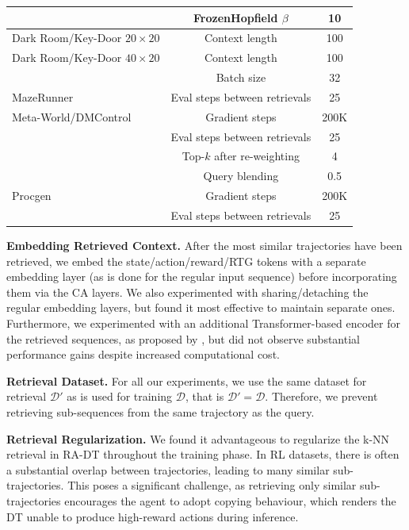 \begin{table}[]
\begin{tabular}{l | c c}
      &      FrozenHopfield $\beta$ & 10 \\
    \midrule
     Dark Room/Key-Door $20\times20$ &      Context length & 100 \\
    \midrule
     Dark Room/Key-Door $40\times20$ &      Context length & 100 \\
      &      Batch size & 32 \\
     \midrule
     MazeRunner &      Eval steps between retrievals & 25 \\
    \midrule
     Meta-World/DMControl &  Gradient steps & 200K \\
      &                      Eval steps between retrievals & 25 \\
      &      Top-$k$ after re-weighting & 4 \\
      &  Query blending                 & 0.5 \\  
    \midrule
     Procgen &      Gradient steps & 200K \\     
             &      Eval steps between retrievals & 25 \\
    \bottomrule
    \end{tabular}
    \label{tab:radt-hparams}
\end{table}

\textbf{Embedding Retrieved Context.}
After the most similar trajectories have been retrieved, we embed the state/action/reward/RTG tokens with a separate embedding layer (as is done for the regular input sequence) before incorporating them via the CA layers.
We also experimented with sharing/detaching the regular embedding layers, but found it most effective to maintain separate ones. 
Furthermore, we experimented with an additional Transformer-based encoder for the retrieved sequences, as proposed by \citet{Borgeaud:22}, but did not observe substantial performance gains despite increased computational cost.

\textbf{Retrieval Dataset.}
For all our experiments, we use the same dataset for retrieval $\mathcal{D}'$ as is used for training $\mathcal{D}$, that is $\mathcal{D}'=\mathcal{D}$.
Therefore, we prevent retrieving sub-sequences from the same trajectory as the query. 

\textbf{Retrieval Regularization.}
We found it advantageous to regularize the k-NN retrieval in RA-DT throughout the training phase.
In RL datasets, there is often a substantial overlap between trajectories, leading to many similar sub-trajectories.
This poses a significant challenge, as retrieving only similar sub-trajectories encourages the agent to adopt copying behaviour, which renders the DT unable to produce high-reward actions during inference. 

